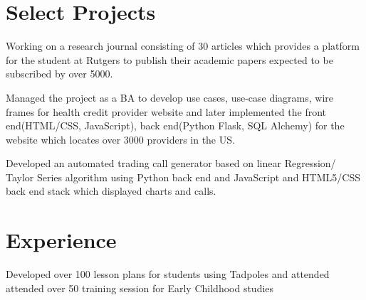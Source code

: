 \documentclass[]{deedy-resume-openfont}
\begin{document}
\hfill
\begin{minipage}[t]{0.66\textwidth} 


\section{Select Projects}
Working on a research journal consisting of 30 articles which provides a platform for the student at Rutgers to publish their academic papers expected to be subscribed by over 5000. \textbf
\sectionsep

\item  Managed the project as a BA to develop use cases, use-case diagrams, wire frames for health credit provider website and later implemented the front end(HTML/CSS, JavaScript), back end(Python Flask, SQL Alchemy) for the website which locates over 3000 providers in the US.\textbf
\sectionsep

Developed an automated trading call generator based on linear Regression/ Taylor Series algorithm  using Python back end and JavaScript and HTML5/CSS back end stack which displayed charts and calls.  \textbf
\sectionsep



\section{Experience}

\vspace{\topsep} %
\begin{tightemize}\item Developed over 100 lesson plans for students using Tadpoles and attended attended over 50 training session for Early Childhood studies
\end{tightemize}
\sectionsep


\end{minipage}
\end{document}
